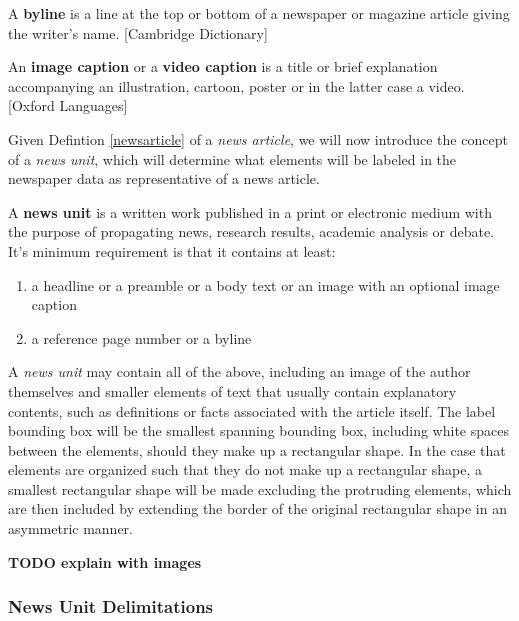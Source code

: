 \documentclass[english, bibtex]{kththesis}
\begin{document}
\begin{definition}
\label{byline}
A \textbf{byline} is a line at the top or bottom of a newspaper or magazine article giving the writer's name. [Cambridge Dictionary]
\end{definition}

\begin{definition}
\label{img}
An \textbf{image caption} or a \textbf{video caption} is a title or brief explanation accompanying an illustration, cartoon, poster or in the latter case a video. [Oxford Languages]
\end{definition}

Given Defintion \ref{newsarticle} of a \textit{news article}, we will now introduce the concept of a \textit{news unit}, which will determine what elements will be labeled in the newspaper data as representative of a news article.

\begin{definition}
\label{newsunit}
A \textbf{news unit} is a written work published in a print or electronic medium with the purpose of propagating news, research results, academic analysis or debate. It’s minimum requirement is that it contains at least:

\begin{enumerate}
\item a headline or a preamble or a body text or an image with an optional image caption
\item a reference page number or a byline
\end{enumerate}
\end{definition}

A \textit{news unit} may contain all of the above, including an image of the author themselves and smaller elements of text that usually contain explanatory contents, such as definitions or facts associated with the article itself. The label bounding box will be the smallest spanning bounding box, including white spaces between the elements, should they make up a rectangular shape. In the case that elements are organized such that they do not make up a rectangular shape, a smallest rectangular shape will be made excluding the protruding elements, which are then included by extending the border of the original rectangular shape in an asymmetric manner.

\textbf{TODO explain with images}

\subsubsection{News Unit Delimitations}
\end{document}
